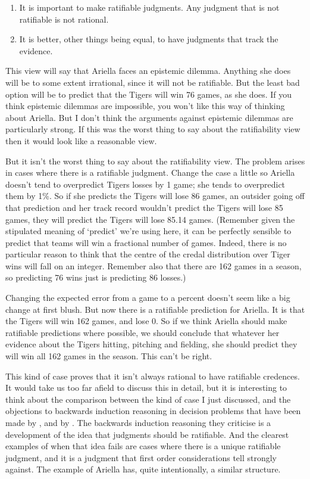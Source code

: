 \begin{enumerate}
\item{} It is important to make ratifiable judgments. Any judgment that is not ratifiable is not rational.

\item{} It is better, other things being equal, to have judgments that track the evidence.

\end{enumerate}
This view will say that \gls{Ariella} faces an epistemic dilemma. Anything she does will be to some extent irrational, since it will not be ratifiable. But the least bad option will be to predict that the Tigers will win 76 games, as she does. If you think epistemic dilemmas are impossible, you won't like this way of thinking about \gls{Ariella}. But I don't think the arguments against epistemic dilemmas are particularly strong. If this was the worst thing to say about the ratifiability view then it would look like a reasonable view.

But it isn't the worst thing to say about the ratifiability view. The problem arises in cases where there is a ratifiable judgment. Change the case a little so \gls{Ariella} doesn't tend to overpredict Tigers losses by 1 game; she tends to overpredict them by 1\%. So if she predicts the Tigers will lose 86 games, an outsider going off that prediction and her track record wouldn't predict the Tigers will lose 85 games, they will predict the Tigers will lose 85.14 games. (Remember given the stipulated meaning of `predict' we're using here, it can be perfectly sensible to predict that teams will win a fractional number of games. Indeed, there is no particular reason to think that the centre of the credal distribution over Tiger wins will fall on an integer. Remember also that there are 162 games in a season, so predicting 76 wins just is predicting 86 losses.)

Changing the expected error from a game to a percent doesn't seem like a big change at first blush. But now there is a ratifiable prediction for \gls{Ariella}. It is that the Tigers will win 162 games, and lose 0. So if we think \gls{Ariella} should make ratifiable predictions where possible, we should conclude that whatever her evidence about the Tigers hitting, pitching and fielding, she should predict they will win all 162 games in the season. This can't be right.

This kind of case proves that it isn't always rational to have ratifiable credences. It would take us too far afield to discuss this in detail, but it is interesting to think about the comparison between the kind of case I just discussed, and the objections to backwards induction reasoning in decision problems that have been made by \citet{PettitSugden1989}, and by \citet{Stalnaker1998}. The backwards induction reasoning they criticise is a development of the idea that judgments should be ratifiable. And the clearest examples of when that idea fails are cases where there is a unique ratifiable judgment, and it is a judgment that first order considerations tell strongly against. The example of \gls{Ariella} has, quite intentionally, a similar structure.

